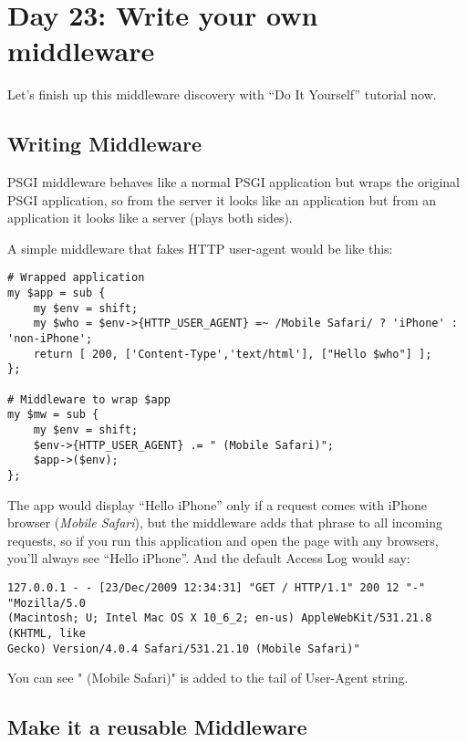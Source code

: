 \chapter{Day 23: Write your own
middleware}\label{day-23-write-your-own-middleware}

Let's finish up this middleware discovery with ``Do It Yourself''
tutorial now.

\section{Writing Middleware}\label{writing-middleware}

PSGI middleware behaves like a normal PSGI application but wraps the
original PSGI application, so from the server it looks like an
application but from an application it looks like a server (plays both
sides).

A simple middleware that fakes HTTP user-agent would be like this:

\begin{lstlisting}
# Wrapped application
my $app = sub {
    my $env = shift;
    my $who = $env->{HTTP_USER_AGENT} =~ /Mobile Safari/ ? 'iPhone' : 'non-iPhone';
    return [ 200, ['Content-Type','text/html'], ["Hello $who"] ];
};

# Middleware to wrap $app
my $mw = sub {
    my $env = shift;
    $env->{HTTP_USER_AGENT} .= " (Mobile Safari)";
    $app->($env);
};
\end{lstlisting}

The app would display ``Hello iPhone'' only if a request comes with
iPhone browser (\emph{Mobile Safari}), but the middleware adds that
phrase to all incoming requests, so if you run this application and open
the page with any browsers, you'll always see ``Hello iPhone''. And the
default Access Log would say:

\begin{lstlisting}
127.0.0.1 - - [23/Dec/2009 12:34:31] "GET / HTTP/1.1" 200 12 "-" "Mozilla/5.0 
(Macintosh; U; Intel Mac OS X 10_6_2; en-us) AppleWebKit/531.21.8 (KHTML, like
Gecko) Version/4.0.4 Safari/531.21.10 (Mobile Safari)"
\end{lstlisting}

You can see " (Mobile Safari)" is added to the tail of User-Agent
string.

\section{Make it a reusable
Middleware}\label{make-it-a-reusable-middleware}

